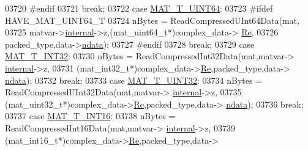 \begin{DoxyCode}
{{{{{{{{{{{{{{{{{{03720 \textcolor{preprocessor}{#endif}
03721                             \textcolor{keywordflow}{break};
03722                         \textcolor{keywordflow}{case} \hyperlink{group___m_a_t_ggacf7b3b879282b7ab3a51190e49bf3453a45547932c46be27118abe08302d7e29f}{MAT\_T\_UINT64}:
03723 \textcolor{preprocessor}{#ifdef HAVE\_MAT\_UINT64\_T}
03724                             nBytes = ReadCompressedUInt64Data(mat,
03725                                 matvar->\hyperlink{group___m_a_t_a6e97e3ed9f40c49322c18561c2a94e92}{internal}->z,(mat\_uint64\_t*)complex\_data->
      \hyperlink{group___m_a_t_a484a93607508adac2bce53a0252e0325}{Re},
03726                                 packed\_type,data->\hyperlink{group___m_a_t_a1beb8a8c58a808207cbea650563a9b63}{ndata});
03727 \textcolor{preprocessor}{#endif}
03728                             \textcolor{keywordflow}{break};
03729                         \textcolor{keywordflow}{case} \hyperlink{group___m_a_t_ggacf7b3b879282b7ab3a51190e49bf3453a83e06a68320726c6572bfbb9f3addb1d}{MAT\_T\_INT32}:
03730                             nBytes = ReadCompressedInt32Data(mat,matvar->
      \hyperlink{group___m_a_t_a6e97e3ed9f40c49322c18561c2a94e92}{internal}->z,
03731                                  (mat\_int32\_t*)complex\_data->\hyperlink{group___m_a_t_a484a93607508adac2bce53a0252e0325}{Re},packed\_type,data->
      \hyperlink{group___m_a_t_a1beb8a8c58a808207cbea650563a9b63}{ndata});
03732                             \textcolor{keywordflow}{break};
03733                         \textcolor{keywordflow}{case} \hyperlink{group___m_a_t_ggacf7b3b879282b7ab3a51190e49bf3453aa397e285a23fe240368b752897652c6a}{MAT\_T\_UINT32}:
03734                             nBytes = ReadCompressedUInt32Data(mat,matvar->
      \hyperlink{group___m_a_t_a6e97e3ed9f40c49322c18561c2a94e92}{internal}->z,
03735                                  (mat\_uint32\_t*)complex\_data->\hyperlink{group___m_a_t_a484a93607508adac2bce53a0252e0325}{Re},packed\_type,data->
      \hyperlink{group___m_a_t_a1beb8a8c58a808207cbea650563a9b63}{ndata});
03736                             \textcolor{keywordflow}{break};
03737                         \textcolor{keywordflow}{case} \hyperlink{group___m_a_t_ggacf7b3b879282b7ab3a51190e49bf3453a8c5b2e381946e95ea8d81ac216743302}{MAT\_T\_INT16}:
03738                             nBytes = ReadCompressedInt16Data(mat,matvar->
      \hyperlink{group___m_a_t_a6e97e3ed9f40c49322c18561c2a94e92}{internal}->z,
03739                                  (mat\_int16\_t*)complex\_data->\hyperlink{group___m_a_t_a484a93607508adac2bce53a0252e0325}{Re},packed\_type,data->
}}}}}}}}}}}}}}}}}}
\end{DoxyCode}
